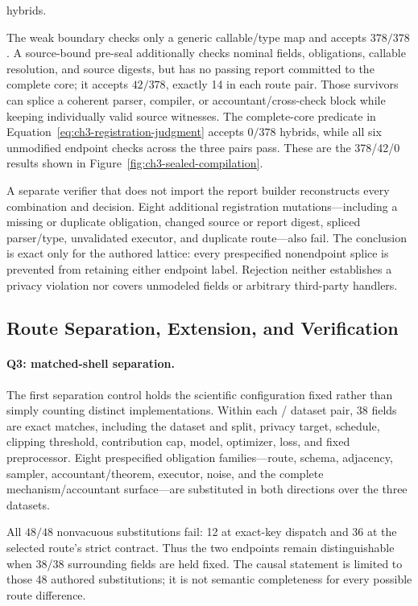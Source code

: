 hybrids.

The weak boundary checks only a generic callable/type map and accepts
\(378/378\).  A source-bound pre-seal additionally checks nominal fields,
obligations, callable resolution, and source digests, but has no passing report
committed to the complete core; it accepts \(42/378\), exactly 14 in each route
pair.  Those survivors can splice a coherent parser, compiler, or
accountant/cross-check block while keeping individually valid source witnesses.
The complete-core predicate in
Equation~\eqref{eq:ch3-registration-judgment} accepts \(0/378\) hybrids, while all
six unmodified endpoint checks across the three pairs pass.  These are the
378/42/0 results shown in Figure~\ref{fig:ch3-sealed-compilation}.

A separate verifier that does not import the report builder reconstructs every
combination and decision.  Eight additional registration mutations---including a
missing or duplicate obligation, changed source or report digest, spliced
parser/type, unvalidated executor, and duplicate route---also fail.  The conclusion
is exact only for the authored lattice: every prespecified nonendpoint splice is
prevented from retaining either endpoint label.  Rejection neither establishes a
privacy violation nor covers unmodeled fields or arbitrary third-party handlers.

\subsection{Route Separation, Extension, and Verification}
\label{subsec:ch3-extension-verification}

\paragraph{Q3: matched-shell separation.}
The first separation control holds the scientific configuration fixed rather than
simply counting distinct implementations.  Within each \RouteP/\RouteF{} dataset
pair, 38 fields are exact matches, including the dataset and split, privacy target,
schedule, clipping threshold, contribution cap, model, optimizer, loss, and fixed
preprocessor.  Eight prespecified obligation families---route, schema, adjacency,
sampler, accountant/theorem, executor, noise, and the complete
mechanism/accountant surface---are substituted in both directions over the three
datasets.

All \(48/48\) nonvacuous substitutions fail: 12 at exact-key dispatch and 36 at
the selected route's strict contract.  Thus the two endpoints remain distinguishable
when 38/38 surrounding fields are held fixed.  The causal statement is limited to
those 48 authored substitutions; it is not semantic completeness for every
possible route difference.

